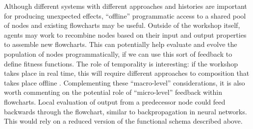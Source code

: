 Although different systems with different approaches and histories are
important for producing unexpected effects, ``offline'' programmatic
access to a shared pool of nodes and existing flowcharts may be
useful.  Outside of the workshop itself, agents may work to recombine
nodes based on their input and output properties to assemble new
flowcharts.  This can potentially help evaluate and evolve the
population of nodes programmatically, if we can use this sort of
feedback to define fitness functions.  The role of
temporality is interesting: if the workshop takes place in real time,
this will require different approaches to composition that takes place
offline \cite{perez2013rolling}.
%
Complementing these ``macro-level'' considerations, it is also worth
commenting on the potential role of ``micro-level'' feedback within
flowcharts.  Local evaluation of output from a predecessor node could
feed backwards through the flowchart, similar to backpropagation in
neural networks.  This would rely on a reduced version of the
functional schema described above.
